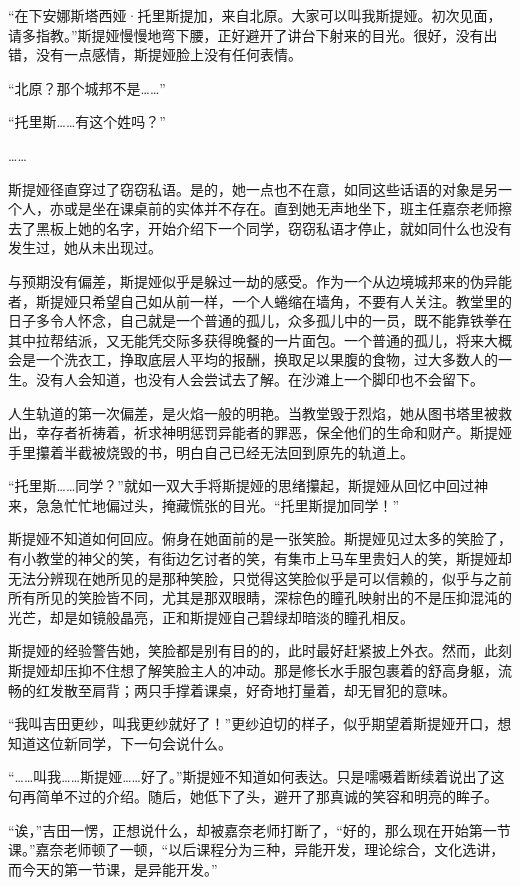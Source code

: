 \documentclass[a5paper, punct=kaiming, fontset=founder]{ctexart}
\begin{document}
“在下安娜斯塔西娅·托里斯提加，来自北原。大家可以叫我斯提娅。初次见面，请多指教。”斯提娅慢慢地弯下腰，正好避开了讲台下射来的目光。很好，没有出错，没有一点感情，斯提娅脸上没有任何表情。

“北原？那个城邦不是……”

“托里斯……有这个姓吗？”

……

斯提娅径直穿过了窃窃私语。是的，她一点也不在意，如同这些话语的对象是另一个人，亦或是坐在课桌前的实体并不存在。直到她无声地坐下，班主任嘉奈老师擦去了黑板上她的名字，开始介绍下一个同学，窃窃私语才停止，就如同什么也没有发生过，她从未出现过。

与预期没有偏差，斯提娅似乎是躲过一劫的感受。作为一个从边境城邦来的伪异能者，斯提娅只希望自己如从前一样，一个人蜷缩在墙角，不要有人关注。教堂里的日子多令人怀念，自己就是一个普通的孤儿，众多孤儿中的一员，既不能靠铁拳在其中拉帮结派，又无能凭交际多获得晚餐的一片面包。一个普通的孤儿，将来大概会是一个洗衣工，挣取底层人平均的报酬，换取足以果腹的食物，过大多数人的一生。没有人会知道，也没有人会尝试去了解。在沙滩上一个脚印也不会留下。

人生轨道的第一次偏差，是火焰一般的明艳。当教堂毁于烈焰，她从图书塔里被救出，幸存者祈祷着，祈求神明惩罚异能者的罪恶，保全他们的生命和财产。斯提娅手里攥着半截被烧毁的书，明白自己已经无法回到原先的轨道上。

“托里斯……同学？”就如一双大手将斯提娅的思绪攥起，斯提娅从回忆中回过神来，急急忙忙地偏过头，掩藏慌张的目光。“托里斯提加同学！”

斯提娅不知道如何回应。俯身在她面前的是一张笑脸。斯提娅见过太多的笑脸了，有小教堂的神父的笑，有街边乞讨者的笑，有集市上马车里贵妇人的笑，斯提娅却无法分辨现在她所见的是那种笑脸，只觉得这笑脸似乎是可以信赖的，似乎与之前所有所见的笑脸皆不同，尤其是那双眼睛，深棕色的瞳孔映射出的不是压抑混沌的光芒，却是如镜般晶亮，正和斯提娅自己碧绿却暗淡的瞳孔相反。

斯提娅的经验警告她，笑脸都是别有目的的，此时最好赶紧披上外衣。然而，此刻斯提娅却压抑不住想了解笑脸主人的冲动。那是修长水手服包裹着的舒高身躯，流畅的红发散至肩背；两只手撑着课桌，好奇地打量着，却无冒犯的意味。

“我叫吉田更纱，叫我更纱就好了！”更纱迫切的样子，似乎期望着斯提娅开口，想知道这位新同学，下一句会说什么。

“……叫我……斯提娅……好了。”斯提娅不知道如何表达。只是嚅嗫着断续着说出了这句再简单不过的介绍。随后，她低下了头，避开了那真诚的笑容和明亮的眸子。

“诶，”吉田一愣，正想说什么，却被嘉奈老师打断了，“好的，那么现在开始第一节课。”嘉奈老师顿了一顿，“以后课程分为三种，异能开发，理论综合，文化选讲，而今天的第一节课，是异能开发。”
\end{document}
